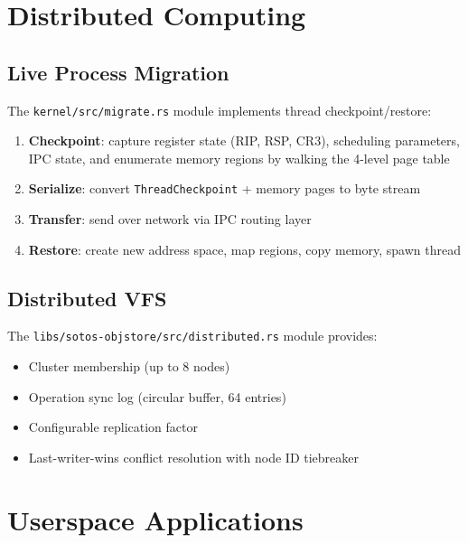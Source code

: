 \documentclass[11pt,letterpaper]{article}
\theoremstyle{definition}
\begin{document}
\section{Distributed Computing}
\label{sec:distributed}

\subsection{Live Process Migration}

The \texttt{kernel/src/migrate.rs} module implements thread checkpoint/restore:

\begin{enumerate}[nosep]
    \item \textbf{Checkpoint}: capture register state (RIP, RSP, CR3), scheduling parameters,
          IPC state, and enumerate memory regions by walking the 4-level page table
    \item \textbf{Serialize}: convert \texttt{ThreadCheckpoint} + memory pages to byte stream
    \item \textbf{Transfer}: send over network via IPC routing layer
    \item \textbf{Restore}: create new address space, map regions, copy memory, spawn thread
\end{enumerate}

\subsection{Distributed VFS}

The \texttt{libs/sotos-objstore/src/distributed.rs} module provides:
\begin{itemize}[nosep]
    \item Cluster membership (up to 8 nodes)
    \item Operation sync log (circular buffer, 64 entries)
    \item Configurable replication factor
    \item Last-writer-wins conflict resolution with node ID tiebreaker
\end{itemize}

\section{Userspace Applications}
\label{sec:apps}
\end{document}
